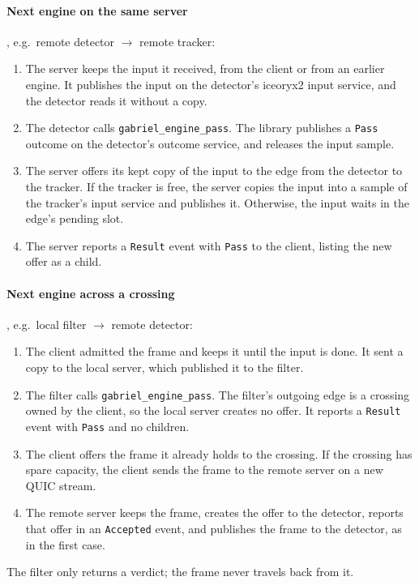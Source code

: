 \documentclass[11pt]{article}
\newcommand{\code}[1]{\texttt{#1}}
\begin{document}
\paragraph{Next engine on the same server}, e.g.\ remote detector $\to$
remote tracker:
\begin{enumerate}[nosep]
  \item The server keeps the input it received, from the client or from an
        earlier engine. It publishes the input on the detector's iceoryx2
        input service, and the detector reads it without a copy.
  \item The detector calls \code{gabriel\_engine\_pass}. The library publishes
        a \code{Pass} outcome on the detector's outcome service, and releases
        the input sample.
  \item The server offers its kept copy of the input to the edge from the
        detector to the tracker. If the tracker is free, the server copies the
        input into a sample of the tracker's input service and publishes it.
        Otherwise, the input waits in the edge's pending slot.
  \item The server reports a \code{Result} event with \code{Pass} to the
        client, listing the new offer as a child.
\end{enumerate}

\paragraph{Next engine across a crossing}, e.g.\ local filter $\to$ remote
detector:
\begin{enumerate}[nosep]
  \item The client admitted the frame and keeps it until the input is done.
        It sent a
        copy to the local server, which published it to the filter.
  \item The filter calls \code{gabriel\_engine\_pass}. The filter's outgoing
        edge is a crossing owned by the client, so the local server creates no
        offer. It reports a \code{Result} event with \code{Pass} and no
        children.
  \item The client offers the frame it already holds to the crossing. If the
        crossing has spare capacity, the client sends the frame to the remote
        server on a new QUIC stream.
  \item The remote server keeps the frame, creates the offer to the detector,
        reports that offer in an \code{Accepted} event, and publishes the
        frame to the detector, as in the first case.
\end{enumerate}
The filter only returns a verdict; the frame never travels back from it.
\end{document}

